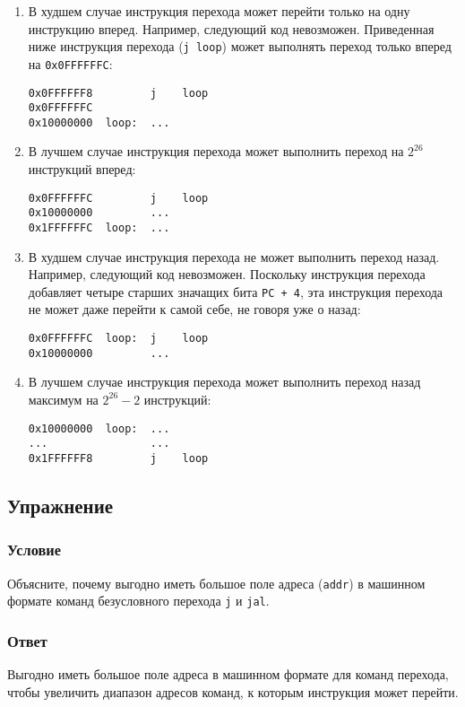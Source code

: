 \documentclass[12pt]{article}
\newenvironment{e}[1][dummy label]{
    \subsection{Упражнение}\label{#1}
    \subsubsection*{Условие}
    }{
    \subsubsection*{Ответ}
}
\begin{document}
    \begin{enumerate}
        \item В худшем случае инструкция перехода может перейти только на одну инструкцию вперед. Например, следующий код невозможен. Приведенная ниже инструкция перехода (\texttt{j loop}) может выполнять переход только вперед на \texttt{0x0FFFFFFC}:
        \begin{verbatim}
0x0FFFFFF8         j    loop
0x0FFFFFFC
0x10000000  loop:  ...
        \end{verbatim}

        \item В лучшем случае инструкция перехода может выполнить переход на $2^{26}$ инструкций вперед:
        \begin{verbatim}
0x0FFFFFFC         j    loop
0x10000000         ...
0x1FFFFFFC  loop:  ...
        \end{verbatim}

        \item В худшем случае инструкция перехода не может выполнить переход назад. Например, следующий код невозможен. Поскольку инструкция перехода добавляет четыре старших значащих бита \texttt{PC + 4}, эта инструкция перехода не может даже перейти к самой себе, не говоря уже о назад:
        \begin{verbatim}
0x0FFFFFFC  loop:  j    loop
0x10000000         ...
        \end{verbatim}

        \newpage

        \item В лучшем случае инструкция перехода может выполнить переход назад максимум на $2^{26} - 2$ инструкций:
        \begin{verbatim}
0x10000000  loop:  ...
...                ...
0x1FFFFFF8         j    loop
        \end{verbatim}
    \end{enumerate}

    \begin{e}
        Объясните, почему выгодно иметь большое поле адреса (\texttt{addr}) в машинном формате команд безусловного перехода \texttt{j} и \texttt{jal}.
    \end{e}

    Выгодно иметь большое поле адреса в машинном формате для команд перехода, чтобы увеличить диапазон адресов команд, к которым инструкция может перейти.

    \vspace{35pt}
\end{document}
